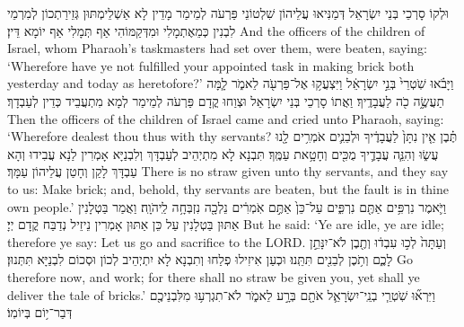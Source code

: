 {{וּלְקוֹ סָרְכֵי בְּנֵי יִשְׂרָאֵל דְּמַנִּיאוּ עֲלֵיהוֹן שִׁלְטוֹנֵי פַּרְעֹה לְמֵימַר מָדֵין לָא אַשְׁלֵימְתּוּן גְּזֵירַתְכוֹן לְמִרְמֵי לִבְנִין כְּמֵאֶתְמָלִי וּמִדְּקַמּוֹהִי אַף תְּמָלִי אַף יוֹמָא דֵּין׃}
{And the officers of the children of Israel, whom Pharaoh’s taskmasters had set over them, were beaten, saying: ‘Wherefore have ye not fulfilled your appointed task in making brick both yesterday and today as heretofore?’}{}
{וַיָּבֹ֗אוּ שֹֽׁטְרֵי֙ בְּנֵ֣י יִשְׂרָאֵ֔ל וַיִּצְעֲק֥וּ אֶל־פַּרְעֹ֖ה לֵאמֹ֑ר לָ֧מָּה תַעֲשֶׂ֦ה כֹ֖ה לַעֲבָדֶֽיךָ׃}
{וַאֲתוֹ סָרְכֵי בְּנֵי יִשְׂרָאֵל וּצְוַחוּ קֳדָם פַּרְעֹה לְמֵימַר לְמָא מִתְעֲבֵיד כְּדֵין לְעַבְדָךְ׃}
{Then the officers of the children of Israel came and cried unto Pharaoh, saying: ‘Wherefore dealest thou thus with thy servants?}{}
{תֶּ֗בֶן אֵ֤ין נִתָּן֙ לַעֲבָדֶ֔יךָ וּלְבֵנִ֛ים אֹמְרִ֥ים לָ֖נוּ עֲשׂ֑וּ וְהִנֵּ֧ה עֲבָדֶ֛יךָ מֻכִּ֖ים וְחָטָ֥את עַמֶּֽךָ׃
}
{תִּבְנָא לָא מִתְיְהֵיב לְעַבְדָּךְ וְלִבְנַיָּא אָמְרִין לַנָא עֲבִידוּ וְהָא עַבְדָּךְ לָקַן וְחָטַן עֲלֵיהוֹן עַמָּךְ׃}
{There is no straw given unto thy servants, and they say to us: Make brick; and, behold, thy servants are beaten, but the fault is in thine own people.’}{}
{וַיֹּ֛אמֶר נִרְפִּ֥ים אַתֶּ֖ם נִרְפִּ֑ים עַל־כֵּן֙ אַתֶּ֣ם אֹֽמְרִ֔ים נֵלְכָ֖ה נִזְבְּחָ֥ה לַֽיהֹוָֽה׃}
{וַאֲמַר בַּטְלָנִין אַתּוּן בַּטְלָנִין עַל כֵּן אַתּוּן אָמְרִין נֵיזֵיל נְדַבַּח קֳדָם יְיָ׃}
{But he said: ‘Ye are idle, ye are idle; therefore ye say: Let us go and sacrifice to the LORD.}{}
{וְעַתָּה֙ לְכ֣וּ עִבְד֔וּ וְתֶ֖בֶן לֹא־יִנָּתֵ֣ן לָכֶ֑ם וְתֹ֥כֶן לְבֵנִ֖ים תִּתֵּֽנוּ׃
}
{וּכְעַן אִיזִילוּ פְלַחוּ וְתִבְנָא לָא יִתְיְהֵיב לְכוֹן וּסְכוֹם לִבְנַיָּא תִּתְּנוּן׃}
{Go therefore now, and work; for there shall no straw be given you, yet shall ye deliver the tale of bricks.’}{}
{וַיִּרְא֞וּ שֹֽׁטְרֵ֧י בְנֵֽי־יִשְׂרָאֵ֛ל אֹתָ֖ם בְּרָ֣ע לֵאמֹ֑ר לֹא־תִגְרְע֥וּ מִלִּבְנֵיכֶ֖ם דְּבַר־י֥וֹם בְּיוֹמֽוֹ׃
}}
